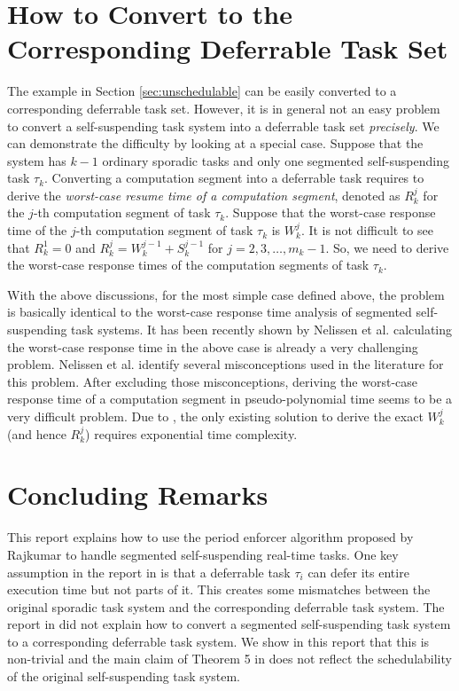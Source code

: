 \section{How to Convert to the Corresponding Deferrable Task Set}
\label{sec:convert}

The example in Section \ref{sec:unschedulable} can be easily converted to a corresponding deferrable task set. However, it is in general not an easy problem to convert a self-suspending task system into a deferrable task set \emph{precisely}. We can demonstrate the difficulty by looking at a special case. Suppose that the system has $k-1$ ordinary sporadic tasks and only one segmented self-suspending task $\tau_k$. Converting a computation segment into a deferrable task requires to derive the \emph{worst-case resume time of a computation segment}, denoted as $R_k^j$ for the $j$-th computation segment of task $\tau_k$. Suppose that the worst-case response time of the $j$-th computation segment of task $\tau_k$ is $W_k^j$. It is not difficult to see that $R_k^1=0$ and $R_k^j = W_k^{j-1}+S_k^{j-1}$ for $j=2,3,\ldots,m_k-1$. So, we need to derive the worst-case response times of the computation segments of task $\tau_k$. 

With the above discussions, for the most simple case defined above, the problem is basically identical to the worst-case response time analysis of segmented self-suspending task systems. It has been recently shown by Nelissen et al. \cite{ecrts15nelissen}  calculating the worst-case response time in the above case is already a very challenging problem. Nelissen et al. \cite{ecrts15nelissen} identify several misconceptions used in the literature for this problem. After excluding those misconceptions, deriving the worst-case response time of a computation segment in pseudo-polynomial time seems to be a very difficult problem. Due to \cite{ecrts15nelissen}, the only existing solution to derive the exact $W_k^{j}$ (and hence $R_k^j$) requires exponential time complexity. 

\section{Concluding Remarks}

This report explains how to use the period enforcer algorithm proposed by Rajkumar \cite{Raj:suspension1991} to handle segmented self-suspending real-time tasks. One key assumption in the report in \cite{Raj:suspension1991} is that a deferrable task $\tau_i$ can defer its entire execution time but not parts of it. This creates some mismatches between the original sporadic task system and the corresponding deferrable task system.  The report in  \cite{Raj:suspension1991} did not explain how to convert a segmented self-suspending task system to a corresponding deferrable task system. We show in this report that this is non-trivial and the main claim of Theorem 5 in \cite{Raj:suspension1991} does not reflect the schedulability of the original self-suspending task system. 


